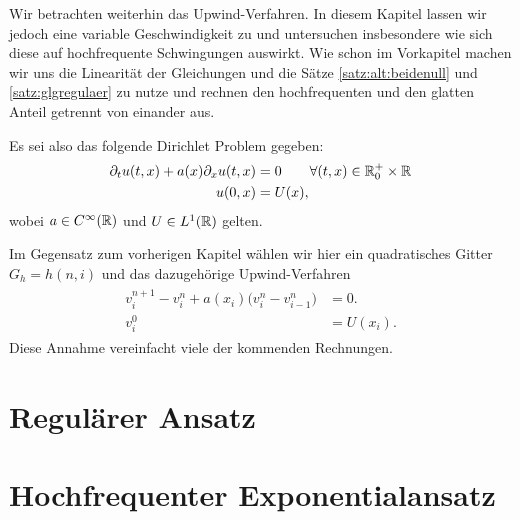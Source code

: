 
Wir betrachten weiterhin das Upwind-Verfahren.
In diesem Kapitel lassen wir jedoch eine variable Geschwindigkeit zu und untersuchen insbesondere wie sich diese auf hochfrequente Schwingungen auswirkt.
Wie schon im Vorkapitel machen wir uns die Linearität der Gleichungen und die Sätze \ref{satz:alt:beidenull} und \ref{satz:glgregulaer} zu nutze und rechnen den hochfrequenten und den glatten Anteil getrennt von einander aus.

Es sei also das folgende Dirichlet Problem gegeben:
\begin{align}\label{eq:varadv:pde}
\begin{split}
\partial_t u(t, x) + a(x) \partial_x u(t, x) &= 0 \qquad \forall (t, x) \in \mathbb R^+_0 \times \mathbb R\\
u(0, x) &= U(x),
\end{split}
\end{align}
wobei $a \in C^\infty(\mathbb R)$ und $U \in L^1(\mathbb R)$ gelten.

Im Gegensatz zum vorherigen Kapitel wählen wir hier ein quadratisches Gitter $G_h = h (n, i)$ und das dazugehörige Upwind-Verfahren
\begin{align}\label{eq:varadv:verfahren}
\begin{split}
v^{n+1}_i - v^n_i + a(x_i) \bigl( v^n_i - v^n_{i-1} \bigr) &= 0.\\
v^0_i &= U(x_i).
\end{split}
\end{align}
Diese Annahme vereinfacht viele der kommenden Rechnungen.

\section{Regulärer Ansatz}



\section{Hochfrequenter Exponentialansatz}

